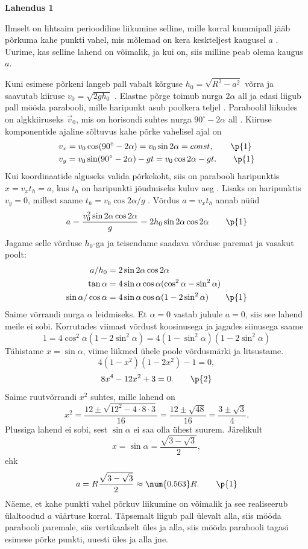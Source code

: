 \textbf{Lahendus 1}

Ilmselt on lihtsaim perioodiline liikumine selline, mille korral kummipall jääb põrkuma kahe punkti vahel, mis mõlemad on kera keskteljest kaugusel $a$ . Uurime, kas selline lahend on võimalik, ja kui on, siis milline peab olema kaugus $a$. 

Kuni esimese põrkeni langeb pall vabalt kõrguse $h_0=\sqrt{R^2-a^2}$ võrra ja saavutab kiiruse $v_0=\sqrt{2gh_0}$ . Elastne põrge toimub nurga $2\alpha$ all  ja edasi liigub pall mööda parabooli, mille haripunkt asub poolkera teljel . Paraboolil liikudes on algkkiiruseks $\vec v_0$, mis on horisondi suhtes nurga $90^\circ-2\alpha$ all . Kiiruse komponentide ajaline sõltuvus kahe põrke vahelisel ajal on
\begin{align*}
    &v_x=v_0\cos(90^\circ-2\alpha)=v_0\sin 2\alpha=const, \qquad\p{1}\\
    &v_y=v_0\sin(90^\circ-2\alpha)-gt=v_0\cos 2\alpha-gt. \qquad\p{1}
\end{align*}
Kui koordinaatide alguseks valida põrkekoht, siis on parabooli haripunktis $x=v_xt_h=a$, kus $t_h$ on haripunkti jõudmiseks kuluv aeg . Lisaks on haripunktis $v_y=0$, millest saame
$t_h=v_0\cos 2\alpha/g$ . Võrdus $a=v_xt_h$ annab nüüd
\[a=\frac{v_0^2\sin2\alpha\cos 2\alpha}{g}=2h_0\sin2\alpha\cos 2\alpha\qquad \p{1}\]
Jagame selle võrduse $h_0$-ga ja teisendame saadava võrduse paremat ja vasakut poolt:
\begin{align*}
a/h_0&=2\sin2\alpha\cos 2\alpha\\
\tan\alpha&=4\sin\alpha\cos\alpha(\cos^2\alpha-\sin^2\alpha)\\
\sin\alpha/\cos\alpha&=4\sin\alpha\cos\alpha(1-2\sin^2\alpha)\qquad \p{1}\\
\end{align*}
Saime võrrandi nurga $\alpha$ leidmiseks. Et $\alpha=0$ vastab juhule $a=0$, siis see lahend meile ei sobi. Korrutades viimast võrdust koosinusega ja jagades siinusega saame
\[1=4\cos^2\alpha(1-2\sin^2\alpha)=4(1-\sin^2\alpha)(1-2\sin^2\alpha)\]
Tähistame $x=\sin\alpha$, viime liikmed ühele poole võrdusmärki ja litsustame.
\[4(1-x^2)(1-2x^2)-1=0,\]
\[8x^4-12x^2+3=0.\qquad \p{2}\]
Saime ruutvõrrandi $x^2$ suhtes, mille lahend on
\[x^2=\frac{12\pm\sqrt{12^2-4\cdot8\cdot3}}{16}=\frac{12\pm\sqrt{48}}{16}=\frac{3\pm\sqrt{3}}{4}.\]
Plussiga lahend ei sobi, sest $\sin\alpha$ ei saa olla ühest suurem. Järelikult
\[x=\sin\alpha=\frac{\sqrt{3-\sqrt{3}}}{2},\]
ehk
\[a=R\frac{\sqrt{3-\sqrt{3}}}{2}\approx\num{0.563}R.\qquad \p{1}\]
Näeme, et kahe punkti vahel põrkuv liikumine on võimalik ja see realiseerub ülaltoodud $a$ väärtuse korral. Täpsemalt liigub pall ülevalt alla, siis mööda parabooli paremale, siis vertikaalselt üles ja alla, siis mööda parabooli tagasi esimese põrke punkti, uuesti üles ja alla jne.

